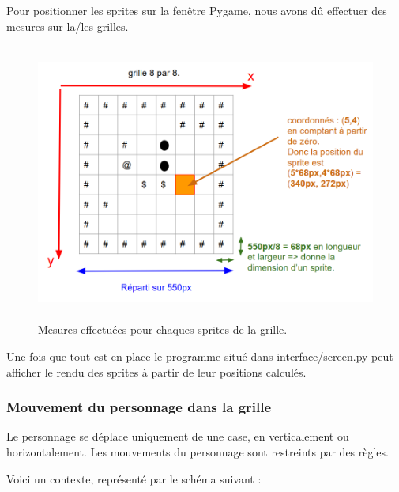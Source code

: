 \documentclass[a4paper,12pt]{article}
\begin{document}
\vspace{5mm}

Pour positionner les sprites sur la fenêtre Pygame, nous avons dû effectuer des mesures sur la/les grilles.

\begin{figure}[H]
\begin{center}
\includegraphics[width=6in, height=3.6in]{./Illustrations/map_4.png}
\end{center}
\caption{Mesures effectuées pour chaques sprites de la grille.}
\end{figure}

Une fois que tout est en place le programme situé dans interface/screen.py peut afficher le rendu des sprites à partir de leur positions calculés.

\subsubsection{Mouvement du personnage dans la grille}

Le personnage se déplace uniquement de une case, en verticalement ou horizontalement.
Les mouvements du personnage sont restreints par des règles.

Voici un contexte, représenté par le schéma suivant :
\end{document}
